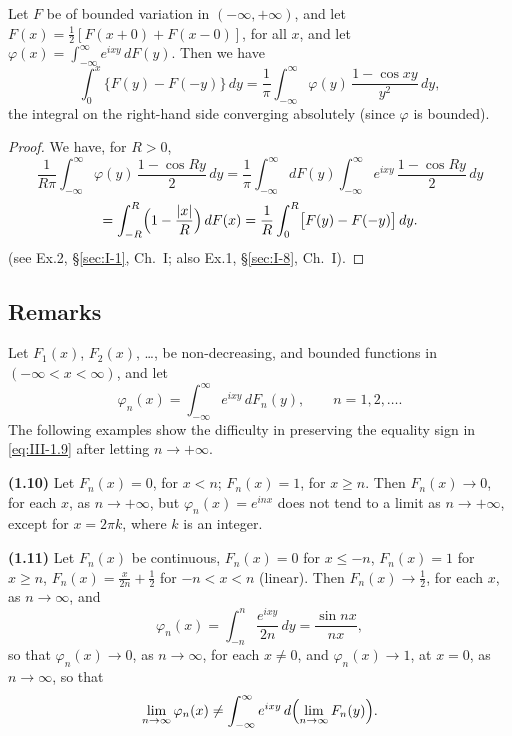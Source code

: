 \begin{theorem}\label{thm:III-2}
Let $F$ be of bounded variation in $(-\infty,+\infty)$, and let $F(x)=\frac12[F(x+0)+F(x-0)]$, for all $x$, and let $\varphi(x)=\int_{-\infty}^{\infty}e^{ixy}\,dF(y)$. Then we have
\begin{equation}\tag{1.8}\label{eq:III-1.8}
\int_{0}^{x}\bigl\{F(y)-F(-y)\bigr\}\,dy=\frac{1}{\pi}\int_{-\infty}^{\infty}\varphi(y)\,\frac{1-\cos xy}{y^{2}}\,dy,
\end{equation}
the integral on the right-hand side converging absolutely (since $\varphi$ is bounded).
\end{theorem}

\begin{proof}
We have, for $R>0$,
\[
\frac{1}{R\pi}\int_{-\infty}^{\infty}\varphi(y)\,\frac{1-\cos Ry}{2}\,dy
=\frac{1}{\pi}\int_{-\infty}^{\infty}dF(y)\int_{-\infty}^{\infty}e^{ixy}\,\frac{1-\cos Ry}{2}\,dy
\]
\[
=\int_{-R}^{R}\Bigl(1-\frac{|x|}{R}\Bigr)\,dF(x)
=\frac{1}{R}\int_{0}^{R}\bigl[F(y)-F(-y)\bigr]\,dy.
\]
(see Ex.2, \S\ref{sec:I-1}, Ch.~I; also Ex.1, \S\ref{sec:I-8}, Ch.~I).
\end{proof}

\subsection*{Remarks}

Let $F_{1}(x)$, $F_{2}(x)$, \dots, be non-decreasing, and bounded functions in $(-\infty<x<\infty)$, and let
\begin{equation}\tag{1.9}\label{eq:III-1.9}
\varphi_{n}(x)=\int_{-\infty}^{\infty}e^{ixy}\,dF_{n}(y),\qquad n=1,2,\dots.
\end{equation}
The following examples show the difficulty in preserving the equality sign in \eqref{eq:III-1.9} after letting $n\to+\infty$.

\noindent\textbf{(1.10)} Let $F_{n}(x)=0$, for $x<n$; $F_{n}(x)=1$, for $x\ge n$. Then $F_{n}(x)\to0$, for each $x$, as $n\to+\infty$, but $\varphi_{n}(x)=e^{inx}$ does not tend to a limit as $n\to+\infty$, except for $x=2\pi k$, where $k$ is an integer.

\noindent\textbf{(1.11)} Let $F_{n}(x)$ be continuous, $F_{n}(x)=0$ for $x\le-n$, $F_{n}(x)=1$ for $x\ge n$, $F_{n}(x)=\frac{x}{2n}+\frac12$ for $-n<x<n$ (linear). Then $F_{n}(x)\to\frac12$, for each $x$, as $n\to\infty$, and
\[
\varphi_{n}(x)=\int_{-n}^{n}\frac{e^{ixy}}{2n}\,dy=\frac{\sin nx}{nx},
\]
so that $\varphi_{n}(x)\to0$, as $n\to\infty$, for each $x\neq0$, and $\varphi_{n}(x)\to1$, at $x=0$, as $n\to\infty$, so that
\[
\lim_{n\to\infty}\varphi_{n}(x)\neq\int_{-\infty}^{\infty}e^{ixy}\,d\Bigl(\lim_{n\to\infty}F_{n}(y)\Bigr).
\]

